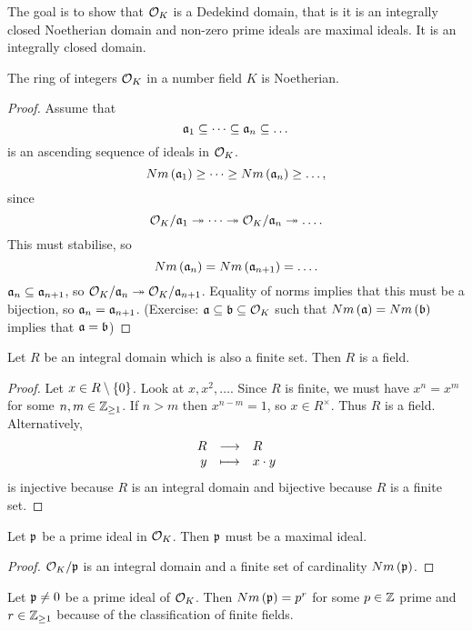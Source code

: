 The goal is to show that $ \OO_K $ is a Dedekind domain, that is it is an integrally closed Noetherian domain and non-zero prime ideals are maximal ideals. It is an integrally closed domain.

\begin{proposition}
The ring of integers $ \OO_K $ in a number field $ K $ is Noetherian.
\end{proposition}

\begin{proof}
Assume that
$$ \aa_1 \subseteq \dots \subseteq \aa_n \subseteq \dots $$
is an ascending sequence of ideals in $ \OO_K $.
$$ Nm\br{\aa_1} \ge \dots \ge Nm\br{\aa_n} \ge \dots, $$
since
$$ \OO_K / \aa_1 \twoheadrightarrow \dots \twoheadrightarrow \OO_K / \aa_n \twoheadrightarrow \dots. $$
This must stabilise, so
$$ Nm\br{\aa_n} = Nm\br{\aa_{n + 1}} = \dots. $$
$ \aa_n \subseteq \aa_{n + 1} $, so $ \OO_K / \aa_n \twoheadrightarrow \OO_K / \aa_{n + 1} $. Equality of norms implies that this must be a bijection, so $ \aa_n = \aa_{n + 1} $. (Exercise: $ \aa \subseteq \bb \subseteq \OO_K $ such that $ Nm\br{\aa} = Nm\br{\bb} $ implies that $ \aa = \bb $)
\end{proof}

\pagebreak

\begin{lemma}
Let $ R $ be an integral domain which is also a finite set. Then $ R $ is a field.
\end{lemma}

\begin{proof}
Let $ x \in R \setminus \cbr{0} $. Look at $ x, x^2, \dots $. Since $ R $ is finite, we must have $ x^n = x^m $ for some $ n, m \in \Z_{\ge 1} $. If $ n > m $ then $ x^{n - m} = 1 $, so $ x \in R^\times $. Thus $ R $ is a field. Alternatively,
$$ \function{R}{R}{y}{x \cdot y} $$
is injective because $ R $ is an integral domain and bijective because $ R $ is a finite set.
\end{proof}

\begin{lemma}
Let $ \pp $ be a prime ideal in $ \OO_K $. Then $ \pp $ must be a maximal ideal.
\end{lemma}

\begin{proof}
$ \OO_K / \pp $ is an integral domain and a finite set of cardinality $ Nm\br{\pp} $.
\end{proof}

\begin{remark*}
Let $ \pp \ne 0 $ be a prime ideal of $ \OO_K $. Then $ Nm\br{\pp} = p^r $ for some $ p \in \Z $ prime and $ r \in \Z_{\ge 1} $ because of the classification of finite fields.
\end{remark*}

